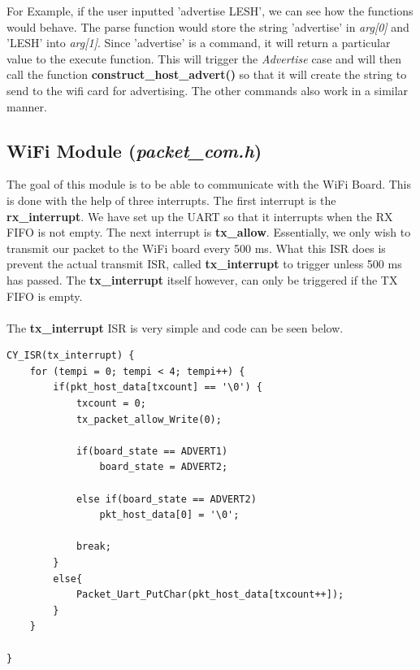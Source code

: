 \documentclass[a4paper, 12pt]{article}
\begin{document}
    For Example, if the user inputted 'advertise LESH', we can see how the 
    functions would behave. The parse function would store the string 
    'advertise' in \textit{arg[0]} and 'LESH' into \textit{arg[1]}. Since
    'advertise' is a command, it will return a particular value to the execute
    function. This will trigger the \textit{Advertise} case and will then
    call the function \textbf{construct\_host\_advert()} so that it will
    create the string to send to the wifi card for advertising. The other
    commands also work in a similar manner.

    


    
    \subsection{WiFi Module (\textit{packet\_com.h})}

    The goal of this module is to be able to communicate with the WiFi Board.
    This is done with the help of three interrupts. The first interrupt is the
    \textbf{rx\_interrupt}. We have set up the UART so that it interrupts when
    the RX FIFO is not empty. The next interrupt is \textbf{tx\_allow}. Essentially,
    we only wish to transmit our packet to the WiFi board every 500 ms. What this
    ISR does is prevent the actual transmit ISR, called \textbf{tx\_interrupt}
    to trigger unless 500 ms has passed. The \textbf{tx\_interrupt} itself
    however, can only be triggered if the TX FIFO is empty.
    \\ \\
    The \textbf{tx\_interrupt} ISR is very simple and code can be seen below.

    \begin{verbatim}
CY_ISR(tx_interrupt) {
    for (tempi = 0; tempi < 4; tempi++) {
        if(pkt_host_data[txcount] == '\0') {
            txcount = 0;
            tx_packet_allow_Write(0);
            
            if(board_state == ADVERT1)
                board_state = ADVERT2;
            
            else if(board_state == ADVERT2)
                pkt_host_data[0] = '\0';
            
            break;
        }
        else{
            Packet_Uart_PutChar(pkt_host_data[txcount++]);
        } 
    }
    
}
    \end{verbatim}
\end{document}
